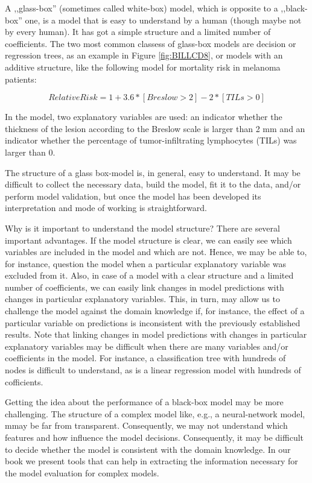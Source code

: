 \documentclass[12pt,]{krantz}
\theoremstyle{definition}
\theoremstyle{definition}
\theoremstyle{definition}
\theoremstyle{remark}
\begin{document}
A ,,glass-box'' (sometimes called white-box) model, which is opposite to
a ,,black-box'' one, is a model that is easy to understand by a human
(though maybe not by every human). It has got a simple structure and a
limited number of coefficients. The two most common classess of
glass-box models are decision or regression trees, as an example in
Figure \ref{fig:BILLCD8}, or models with an additive structure, like the
following model for mortality risk in melanoma patients:

\[
RelativeRisk = 1 + 3.6 * [Breslow > 2] - 2 * [TILs > 0] 
\]

In the model, two explanatory variables are used: an indicator whether
the thickness of the lesion according to the Breslow scale is larger
than 2 mm and an indicator whether the percentage of tumor-infiltrating
lymphocytes (TILs) was larger than 0.

The structure of a glass box-model is, in general, easy to understand.
It may be difficult to collect the necessary data, build the model, fit
it to the data, and/or perform model validation, but once the model has
been developed its interpretation and mode of working is
straightforward.

Why is it important to understand the model structure? There are several
important advantages. If the model structure is clear, we can easily see
which variables are included in the model and which are not. Hence, we
may be able to, for instance, question the model when a particular
explanatory variable was excluded from it. Also, in case of a model with
a clear structure and a limited number of coefficients, we can easily
link changes in model predictions with changes in particular explanatory
variables. This, in turn, may allow us to challenge the model against
the domain knowledge if, for instance, the effect of a particular
variable on predictions is inconsistent with the previously established
results. Note that linking changes in model predictions with changes in
particular explanatory variables may be difficult when there are many
variables and/or coefficients in the model. For instance, a
classification tree with hundreds of nodes is difficult to understand,
as is a linear regression model with hundreds of cofficients.

Getting the idea about the performance of a black-box model may be more
challenging. The structure of a complex model like, e.g., a
neural-network model, mmay be far from transparent. Consequently, we may
not understand which features and how influence the model decisions.
Consequently, it may be difficult to decide whether the model is
consistent with the domain knowledge. In our book we present tools that
can help in extracting the information necessary for the model
evaluation for complex models.
\end{document}
